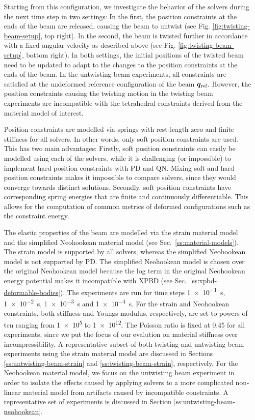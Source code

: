 Starting from this configuration, we investigate the behavior of the 
solvers during the next time step in two settings: In the first, the position constraints at the ends of the beam are released, causing the 
beam to untwist (see Fig. \ref{fig:twisting-beam-setup}, top right). In the second, the beam is twisted further in accordance with a fixed angular
velocity as described above (see Fig. \ref{fig:twisting-beam-setup}, bottom right). In both settings, the initial positions of the twisted beam 
need to be updated to adapt to the changes to the position constraints at the ends of the beam. In the untwisting beam experiments, all constraints are satisfied at the 
undeformed reference configuration of the beam $\bm{q}_\text{ref}$. However, the position constraints causing the twisting motion in the twisting beam experiments are 
incompatible with the tetrahedral constraints derived from the material model of interest. 

Position constraints are modelled via springs with rest-length zero and finite stiffness for all solvers. In other words, only soft position constraints 
are used. This has two main advantages: Firstly, soft position constraints can easily be modelled using each of the solvers, while it is challenging (or impossible) to 
implement hard position constraints with PD and QN. Mixing soft and hard position constraints makes it impossible to compare solvers,
since they would converge towards distinct solutions. Secondly, soft position constraints have corresponding spring energies that are 
finite and continuously differentiable. This allows for the computation of common metrics of deformed configurations such as the constraint 
energy. 

The elastic properties of the beam are modelled via the strain material model and the simplified Neohookean 
material model (see Sec.\ \ref{ss:material-models}). The strain model is supported by all solvers, whereas the simplified Neohookean model is 
not supported by PD. The simplified Neohookean model is chosen over the original Neohookean model because the log term in the original 
Neohookean energy potential makes it incompatible with XPBD (see Sec.\ \ref{ss:xpbd-deformable-bodies}). The experiments are run for time steps 
\SI{1e-1}{\second}, \SI{1e-2}{\second}, \SI{1e-3}{\second} and \SI{1e-4}{\second}. For the strain and Neohookean constraints, both 
stiffness and Youngs modulus, respectively, are set to powers of ten ranging from \num{1e5} to \num{1e12}. The Poisson ratio is fixed 
at 0.45 for all experiments, since we put the focus of our evalution on material stiffness over incompressibility. A representative subset of both twisting and untwisting 
beam experiments using the strain material model are discussed in Sections \ref{ss:untwisting-beam-strain} and \ref{ss:twisting-beam-strain}, respectively. For the 
Neohookean material model, we focus on the untwisting beam experiment in order to isolate the effects caused by applying solvers to a more complicated non-linear material 
model from artifacts caused by incompatible constraints. A representative set of experiments is discussed in Section \ref{ss:untwisting-beam-neohookean}.

